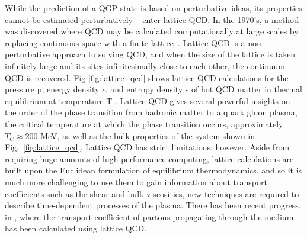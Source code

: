 While the prediction of a QGP state is based on perturbative ideas, its properties cannot be estimated perturbatively -- enter lattice QCD. In the 1970's, a method was discovered where QCD may be calculated computationally at large scales by replacing continuous space with a finite lattice~\cite{Wilson1974}. Lattice QCD is a non-perturbative approach to solving QCD, and when the size of the lattice is taken infinitely large and its sites infinitesimally close to each other, the continuum QCD is recovered. Fig \ref{fig:lattice_qcd} shows lattice QCD calculations for the  pressure p, energy density $\epsilon$, and entropy density s of hot QCD matter in thermal equilibrium at temperature T \cite{Borsanyi2014,HotQCDCollaboration2014}. Lattice QCD gives several powerful insights on the order of the phase transition from hadronic matter to a quark gluon plasma, the critical temperature at which the phase transition occurs, approximately $T_C\approx$200 MeV, as well as the bulk properties of the system shown in Fig.~\ref{fig:lattice_qcd}. Lattice QCD has strict limitations, however. Aside from requiring huge amounts of high performance computing, lattice calculations are built upon the Euclidean formulation of equilibrium thermodynamics, and so it is much more challenging to use them to gain information about transport coefficients such as the shear and bulk viscosities, new techniques are required to describe time-dependent processes of the plasma. There has been recent progress, in \cite{Kumar2021}, where the transport coefficient of partons propagating through the medium has been calculated using lattice QCD.


